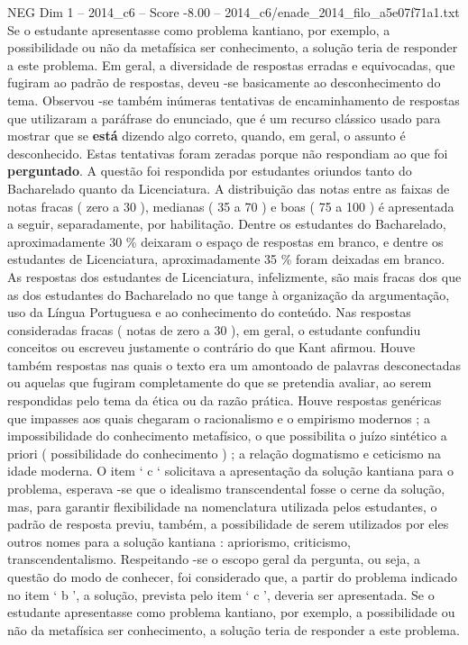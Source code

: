 \begin{textsample}{NEG Dim 1 – 2014\_c6 – Score -8.00 – 2014\_c6/enade\_2014\_filo\_a5e07f71a1.txt}
Se o estudante apresentasse como problema kantiano, por exemplo, a possibilidade ou não da metafísica ser conhecimento, a solução teria de responder a este problema.
Em geral, a diversidade de respostas erradas e equivocadas, que fugiram ao padrão de respostas, deveu -se basicamente ao desconhecimento do tema.
Observou -se também inúmeras tentativas de encaminhamento de respostas que utilizaram a paráfrase do enunciado, que é um recurso clássico usado para mostrar que se \textbf{está} dizendo algo correto, quando, em geral, o assunto é desconhecido.
Estas tentativas foram zeradas porque não respondiam ao que foi \textbf{perguntado}.
A questão foi respondida por estudantes oriundos tanto do Bacharelado quanto da Licenciatura.
A distribuição das notas entre as faixas de notas fracas ( zero a 30 ), medianas ( 35 a 70 ) e boas ( 75 a 100 ) é apresentada a seguir, separadamente, por habilitação.
Dentre os estudantes do Bacharelado, aproximadamente 30 \% deixaram o espaço de respostas em branco, e dentre os estudantes de Licenciatura, aproximadamente 35 \% foram deixadas em branco.
As respostas dos estudantes de Licenciatura, infelizmente, são mais fracas dos que as dos estudantes do Bacharelado no que tange à organização da argumentação, uso da Língua Portuguesa e ao conhecimento do conteúdo.
Nas respostas consideradas fracas ( notas de zero a 30 ), em geral, o estudante confundiu conceitos ou escreveu justamente o contrário do que Kant afirmou.
Houve também respostas nas quais o texto era um amontoado de palavras desconectadas ou aquelas que fugiram completamente do que se pretendia avaliar, ao serem respondidas pelo tema da ética ou da razão prática.
Houve respostas genéricas que impasses aos quais chegaram o racionalismo e o empirismo modernos ; a impossibilidade do conhecimento metafísico, o que possibilita o juízo sintético a priori ( possibilidade do conhecimento ) ; a relação dogmatismo e ceticismo na idade moderna.
O item ‘ c ‘ solicitava a apresentação da solução kantiana para o problema, esperava -se que o idealismo transcendental fosse o cerne da solução, mas, para garantir flexibilidade na nomenclatura utilizada pelos estudantes, o padrão de resposta previu, também, a possibilidade de serem utilizados por eles outros nomes para a solução kantiana : apriorismo, criticismo, transcendentalismo.
Respeitando -se o escopo geral da pergunta, ou seja, a questão do modo de conhecer, foi considerado que, a partir do problema indicado no item ‘ b ’, a solução, prevista pelo item ‘ c ’, deveria ser apresentada.
Se o estudante apresentasse como problema kantiano, por exemplo, a possibilidade ou não da metafísica ser conhecimento, a solução teria de responder a este problema.

\end{textsample}
